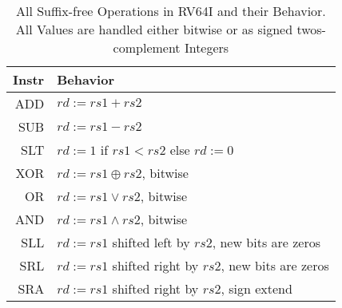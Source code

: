 \begin{table}
    \centering
    \begin{tabular}{>{\ttfamily}r|l}
        \hline
        Instr & Behavior                                               \\
        \hline
        ADD   & $rd := rs1 + rs2$                                      \\
        SUB   & $rd := rs1 - rs2$                                      \\
        SLT   & $rd := 1$ if $rs1 < rs2$ else $rd := 0$                \\
        XOR   & $rd := rs1 \oplus rs2$, bitwise                        \\
        OR    & $rd := rs1 \vee rs2$, bitwise                          \\
        AND   & $rd := rs1 \wedge rs2$, bitwise                        \\
        SLL   & $rd := rs1$ shifted left by $rs2$, new bits are zeros  \\
        SRL   & $rd := rs1$ shifted right by $rs2$, new bits are zeros \\
        SRA   & $rd := rs1$ shifted right by $rs2$, sign extend        \\
    \end{tabular}
    \caption[Behavior of RV64I Operations]{All Suffix-free
        Operations in RV64I and their Behavior. All Values are handled either bitwise or as signed twos-complement Integers}\label{tab:operations}
\end{table}
